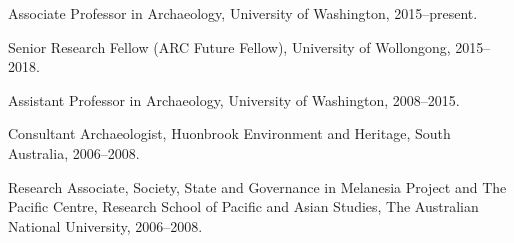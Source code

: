 
\ind Associate Professor in Archaeology,  University of Washington, 2015--present.

\ind Senior Research Fellow (ARC Future Fellow),  University of Wollongong, 2015--2018.     

\ind Assistant Professor in Archaeology,  University of Washington, 2008--2015.     

\ind Consultant Archaeologist, Huonbrook Environment and Heritage, South Australia, 2006--2008.

\ind Research Associate, Society, State and Governance in Melanesia Project and The Pacific Centre, Research School of Pacific and Asian Studies, The Australian National University, 2006--2008.
